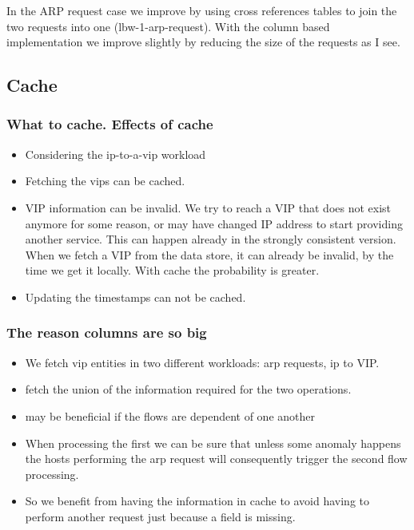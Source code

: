 {In the ARP request case  we improve by using cross references tables
to join the two requests into one (lbw-1-arp-request). With the column
based implementation we improve slightly by reducing the size of the
requests as I see.

\subsection{Cache}

\subsubsection{What to cache. Effects of cache}

\begin{itemize}
\item Considering the ip-to-a-vip workload
\item Fetching the vips  can be cached. 

\item VIP information can be invalid. We try to reach a VIP that does not
  exist anymore for some reason, or may have changed IP address to
  start providing another service. This can happen already in the
  strongly consistent version. When we fetch a VIP from the data
  store, it can already be invalid, by the time we get it
  locally. With cache the probability is greater.  

\item Updating the timestamps can not be cached. 
\end{itemize}

\subsubsection{The reason columns are so big}
\begin{itemize}
\item We fetch \gls{vip} entities in two different workloads: arp
  requests, ip to VIP. 
\item fetch the union of the information required for the two
operations.
\item may be beneficial if the flows are dependent of one another
\item  When processing the first we can be sure that unless some
anomaly happens the hosts performing the arp request will consequently
trigger the second flow processing.
\item So we benefit from having the
information in cache to avoid having to perform another request just
because a field is missing. 
\end{itemize}

}
